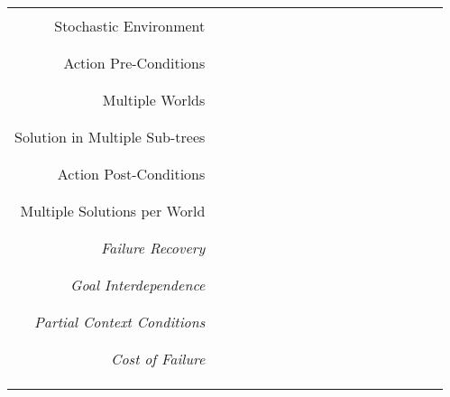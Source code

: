\documentclass[landscape,a4paper,title page]{article}
\newcommand{\x}{{\checked}}
\begin{document}
\begin{table}[!htb]
\begin{tabular}{ r | c  c  c  c  c  c  c  c  c  c  c  c  c  c  c  c }
  \\ \hline \\
  Stochastic Environment & \x & \x & \x & \x & \x & \x & \x & \x & \x & \x & \x & \x & \x & \x & \x \\
  \\ \hline \\
  Action Pre-Conditions & \x & \x & \x & \x & \x & \x & \x & \x & \x & \x & \x & \x & \x & \x & \x \\
  \\ \hline \\
  Multiple Worlds &   &   &   &   &   & \x & \x & \x & \x & \x & \x & \x & \x & \x & \x \\
  \\ \hline \\
  Solution in Multiple Sub-trees &   &   &   &   &   & \x & \x & \x & \x & \x & \x &   & \x & \x & \x  \\
  \\ \hline \\
  Action Post-Conditions &   &   &   &   &   &   &   &   &   &   &   &   & \x &   &   \\
  \\ \hline \\
  Multiple Solutions per World &   &   &   &   &   &   &   &   &   &   &   &   &   &   & \x \\
  \\ \hline \\
  \textit{Failure Recovery} &   &   &   &   &   &   &   &   &   &   &   &   &   &   &   \\
  \\ \hline \\
  \textit{Goal Interdependence} &   &   &   &   &   &   &   &   &   &   &   &   &   &   &   \\
  \\ \hline \\
  \textit{Partial Context Conditions} &   &   &   &   &   &   &   &   &   &   &   &   &   &   &   \\
  \\ \hline \\
  \textit{Cost of Failure} &   &   &   &   &   &   &   &   &   &   &   &   &   &   &   \\
  \\ \hline \\ \\
  \end{tabular}
  \label{tab:perofrmanceFactors}
\end{table}
\end{document}
